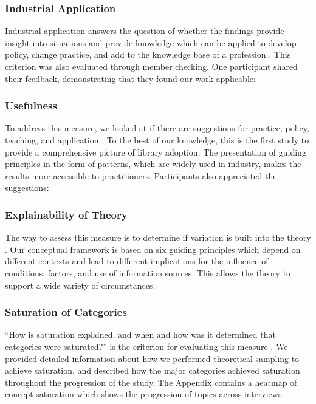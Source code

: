 \subsubsection{Industrial Application} Industrial application answers the question of whether the findings provide insight into situations and provide knowledge which can be applied to develop policy, change practice, and add to the knowledge base of a profession \cite{corbin2014gt}. This criterion was also evaluated through member checking. One participant shared their feedback, demonstrating that they found our work applicable: 

\subsubsection{Usefulness} To address this measure, we looked at if there are suggestions for practice, policy, teaching, and application \cite{corbin2014gt}. To the best of our knowledge, this is the first study to provide a comprehensive picture of library adoption. The presentation of guiding principles in the form of patterns, which are widely used in industry, makes the results more accessible to practitioners. Participants also appreciated the suggestions:

\subsubsection{Explainability of Theory} The way to assess this measure is to determine if variation is built into the theory \cite{corbin2014gt}. Our conceptual framework is based on six guiding principles which depend on different contexts and lead to different implications for the influence of conditions, factors, and use of information sources. This allows the theory to support a wide variety of circumstances.

\subsubsection{Saturation of Categories} ``How is saturation explained, and when and how was it determined that categories were saturated?'' is the criterion for evaluating this measure \cite{corbin2014gt}. We provided detailed information about how we performed theoretical sampling to achieve saturation, and described how the major categories achieved saturation throughout the progression of the study. The Appendix contains a heatmap of concept saturation which shows the progression of topics across interviews.





